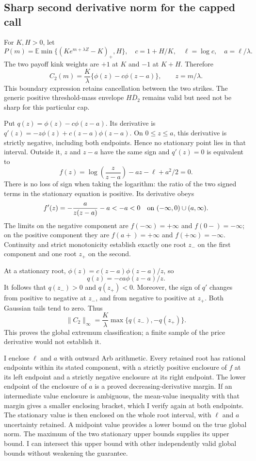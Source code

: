 \subsection{Sharp second derivative norm for the capped call}
\label{sec:capped-second-boundary-norm}

For $K,H>0$, let
\[
 P(m)=\mathbb E\min\{(Ke^{m+\lambda Z}-K)_+,H\},\quad
 c=1+H/K,\quad\ell=\log c,\quad a=\ell/\lambda.
\]
The two payoff kink weights are $+1$ at $K$ and $-1$ at $K+H$. Therefore
\[
 C_2(m)=\frac K\lambda\{\phi(z)-c\phi(z-a)\},\qquad z=m/\lambda.
\]
This boundary expression retains cancellation between the two strikes.
The generic positive threshold-mass envelope $H\overline D_2$ remains
valid but need not be sharp for this particular cap.

Put $q(z)=\phi(z)-c\phi(z-a)$. Its derivative is
$q'(z)=-z\phi(z)+c(z-a)\phi(z-a)$. On $0\leq z\leq a$, this derivative
is strictly negative, including both endpoints. Hence no stationary point
lies in that interval. Outside it, $z$ and $z-a$ have the same sign and
$q'(z)=0$ is equivalent to
\[
 f(z)=\log\!\left(\frac z{z-a}\right)-az-\ell+a^2/2=0.
\]
There is no loss of sign when taking the logarithm: the ratio of the two
signed terms in the stationary equation is positive. Its derivative obeys
\[
 f'(z)=-\frac a{z(z-a)}-a<-a<0
 \quad\hbox{on }(-\infty,0)\cup(a,\infty).
\]
The limits on the negative component are
$f(-\infty)=+\infty$ and $f(0-)=-\infty$; on the positive component they
are $f(a+)=+\infty$ and $f(+\infty)=-\infty$. Continuity and strict
monotonicity establish exactly one root $z_-$ on the first component and
one root $z_+$ on the second.

At a stationary root,
$\phi(z)=c(z-a)\phi(z-a)/z$, so
\[
 q(z)=-ca\phi(z-a)/z.
\]
It follows that $q(z_-)>0$ and $q(z_+)<0$. Moreover, the sign of $q'$
changes from positive to negative at $z_-$, and from negative to positive
at $z_+$. Both Gaussian tails tend to zero. Thus
\[
 \|C_2\|_\infty
 =\frac K\lambda\max\{q(z_-),-q(z_+)\}.
\]
This proves the global extremum classification; a finite sample of the
price derivative would not establish it.

I enclose $\ell$ and $a$ with outward Arb arithmetic. Every retained root
has rational endpoints within its stated component, with a strictly
positive enclosure of $f$ at its left endpoint and a strictly negative
enclosure at its right endpoint. The lower endpoint of the enclosure of
$a$ is a proved decreasing-derivative margin. If an intermediate value
enclosure is ambiguous, the mean-value inequality with that margin gives
a smaller enclosing bracket, which I verify again at both endpoints.
The stationary value is then enclosed on the whole root interval, with
$\ell$ and $a$ uncertainty retained. A midpoint value provides a lower
bound on the true global norm. The maximum of the two stationary upper
bounds supplies its upper bound. I can intersect this upper bound with
other independently valid global bounds without weakening the guarantee.

